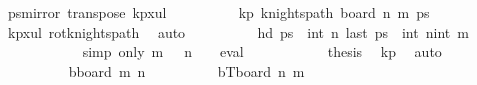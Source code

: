 \begin{isabellebody}
\ {\isacharquery}{\kern0pt}ps{\isacharequal}{\kern0pt}{\isachardoublequoteopen}mirror{}\ {\isacharparenleft}{\kern0pt}transpose\ kp{}x{}ul{\isacharparenright}{\kern0pt}{\isachardoublequoteclose}\isanewline
\ \ \ \ \ \ \ \ \isamarkupfalse%
\ kp{\isacharcolon}{\kern0pt}\ {\isachardoublequoteopen}knights{\isacharunderscore}{\kern0pt}path\ {\isacharparenleft}{\kern0pt}board\ n\ m{\isacharparenright}{\kern0pt}\ {\isacharquery}{\kern0pt}ps{\isachardoublequoteclose}\isanewline
\ \ \ \ \ \ \ \ \ \ \isamarkupfalse%
\ kp{\isacharunderscore}{\kern0pt}{}x{}{\isacharunderscore}{\kern0pt}ul\ rot{}{}{\isacharunderscore}{\kern0pt}knights{\isacharunderscore}{\kern0pt}path\ \isamarkupfalse%
\ auto\isanewline
\ \ \ \ \ \ \ \ \isamarkupfalse%
\ {\isachardoublequoteopen}hd\ {\isacharquery}{\kern0pt}ps\ {\isacharequal}{\kern0pt}\ {\isacharparenleft}{\kern0pt}int\ n{\isacharcomma}{\kern0pt}{}{\isacharparenright}{\kern0pt}{\isachardoublequoteclose}\ {\isachardoublequoteopen}last\ {\isacharquery}{\kern0pt}ps\ {\isacharequal}{\kern0pt}\ {\isacharparenleft}{\kern0pt}int\ n{\isacharminus}{\kern0pt}{}{\isacharcomma}{\kern0pt}int\ m{\isacharminus}{\kern0pt}{}{\isacharparenright}{\kern0pt}{\isachardoublequoteclose}\isanewline
\ \ \ \ \ \ \ \ \ \ \isamarkupfalse%
\ {\isacharparenleft}{\kern0pt}simp\ only{\isacharcolon}{\kern0pt}\ {\isacartoucheopen}m\ {\isacharequal}{\kern0pt}\ {}{\isacartoucheclose}\ {\isacartoucheopen}n\ {\isacharequal}{\kern0pt}\ {}{\isacartoucheclose}\ {\isacharbar}{\kern0pt}\ eval{\isacharparenright}{\kern0pt}{\isacharplus}{\kern0pt}\isanewline
\ \ \ \ \ \ \ \ \isamarkupfalse%
\ \isamarkupfalse%
\ {\isacharquery}{\kern0pt}thesis\ \isamarkupfalse%
\ kp\ \isamarkupfalse%
\ auto\isanewline
\ \ \ \ \ \ \isamarkupfalse%
\isanewline
\ \ \ \ \ \ \ \ \isamarkupfalse%
\ {\isacharquery}{\kern0pt}bboard\ m\ {\isacharparenleft}{\kern0pt}n{\isacharminus}{\kern0pt}{}{\isacharparenright}{\kern0pt}{\isachardoublequoteclose}\isanewline
\ \ \ \ \ \ \ \ \isamarkupfalse%
\ {\isacharquery}{\kern0pt}bT{\isacharequal}{\kern0pt}{\isachardoublequoteopen}board\ {\isacharparenleft}{\kern0pt}n{\isacharminus}{\kern0pt}{}{\isacharparenright}{\kern0pt}\ m{\isachardoublequoteclose}\isanewline

\end{isabellebody}
